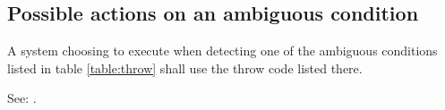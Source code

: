 \subsection{Possible actions on an ambiguous condition} %
\label{exception:ambiguous}

A system choosing to execute  when detecting one of the
ambiguous conditions listed in table \ref{table:throw} shall use the
throw code listed there.

See: .


\newcommand{\throwdef}[3][\empty]{%
	\ifx\empty#1%
		\defthrowcode{#2}{#3}
		\newline
	\else
		\cbstart
			\uline{\defthrowcode{#2}{#3}}
			\hfill{\tiny\textsf{#1}}
		\cbend\newline
	\fi
}


\newcommand{\defthrowcode}[2]{%
	\makebox[1.6em][r]{#1}\hspace{1em}#2
}

